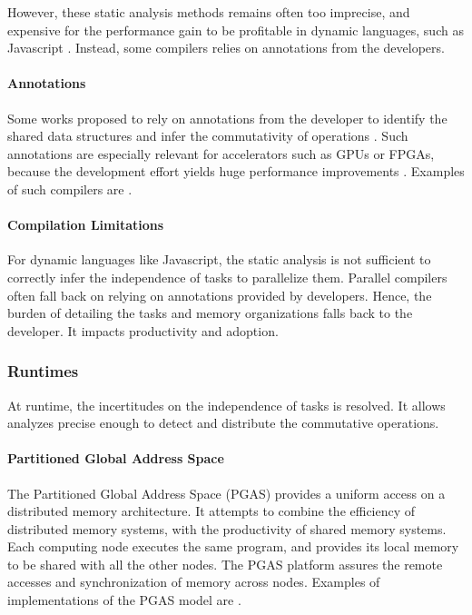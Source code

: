 However, these static analysis methods remains often too imprecise, and expensive for the performance gain to be profitable in dynamic languages, such as Javascript \cite{Shivers1991}.
Instead, some compilers relies on annotations from the developers.

\paragraph{Annotations}

Some works proposed to rely on annotations from the developer to identify the shared data structures and infer the commutativity of operations \cite{Vandierendonck2010a,Fernandez2014a}.
Such annotations are especially relevant for accelerators such as GPUs or FPGAs, because the development effort yields huge performance improvements \cite{Tarditi2006}.
Examples of such compilers are .


\paragraph{Compilation Limitations}

For dynamic languages like Javascript, the static analysis is not sufficient to correctly infer the independence of tasks to parallelize them.
Parallel compilers often fall back on relying on annotations provided by developers.
Hence, the burden of detailing the tasks and memory organizations falls back to the developer.
It impacts productivity and adoption.

\subsubsection{Runtimes} \label{chapter3:software-adoption:runtimes}

At runtime, the incertitudes on the independence of tasks is resolved.
It allows analyzes precise enough to detect and distribute the commutative operations.

\paragraph{Partitioned Global Address Space}

The Partitioned Global Address Space (PGAS) provides a uniform access on a distributed memory architecture.
It attempts to combine the efficiency of distributed memory systems, with the productivity of shared memory systems.
Each computing node executes the same program, and provides its local memory to be shared with all the other nodes.
The PGAS platform assures the remote accesses and synchronization of memory across nodes.
Examples of implementations of the PGAS model are .

